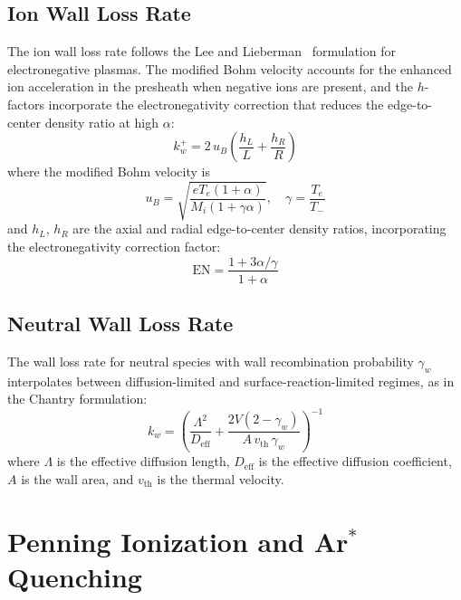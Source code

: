 \documentclass[11pt,a4paper]{report}
\newcommand{\Te}{T_e}
\begin{document}
\subsection{Ion Wall Loss Rate}
\label{sec:gasphase_ionwall}

The ion wall loss rate follows the Lee and Lieberman~\cite{Lee1995} formulation for electronegative plasmas.  The modified Bohm velocity accounts for the enhanced ion acceleration in the presheath when negative ions are present, and the $h$-factors incorporate the electronegativity correction that reduces the edge-to-center density ratio at high $\alpha$:
\begin{equation}
k_w^+ = 2\, u_B \left( \frac{h_L}{L} + \frac{h_R}{R} \right)
\label{eq:gas_kwplus}
\end{equation}
where the modified Bohm velocity is
\begin{equation}
u_B = \sqrt{\frac{e\Te(1+\alpha)}{M_i(1+\gamma\alpha)}}, \quad \gamma = \frac{\Te}{T_-}
\label{eq:gas_uB}
\end{equation}
and $h_L$, $h_R$ are the axial and radial edge-to-center density ratios, incorporating the electronegativity correction factor:
\begin{equation}
\mathrm{EN} = \frac{1 + 3\alpha/\gamma}{1 + \alpha}
\label{eq:gas_EN}
\end{equation}

\subsection{Neutral Wall Loss Rate}
\label{sec:gasphase_neutralwall}

The wall loss rate for neutral species with wall recombination probability $\gamma_w$ interpolates between diffusion-limited and surface-reaction-limited regimes, as in the Chantry formulation:
\begin{equation}
k_w = \left( \frac{\Lambda^2}{D_\mathrm{eff}} + \frac{2V(2-\gamma_w)}{A\, v_\mathrm{th}\, \gamma_w} \right)^{-1}
\label{eq:gas_kw_neutral}
\end{equation}
where $\Lambda$ is the effective diffusion length, $D_\mathrm{eff}$ is the effective diffusion coefficient, $A$ is the wall area, and $v_\mathrm{th}$ is the thermal velocity.

\section{Penning Ionization and Ar$^*$ Quenching}
\label{sec:gasphase_penning}
\end{document}

